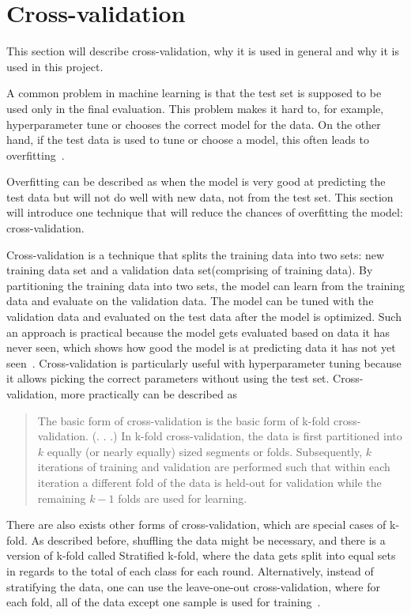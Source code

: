 \section{Cross-validation}\label{sec:cross-validation}
This section will describe cross-validation, why it is used in general and why it is used in this project.

A common problem in machine learning is that the test set is supposed to be used only in the final evaluation. This problem makes it hard to, for example, hyperparameter tune or chooses the correct model for the data. On the other hand, if the test data is used to tune or choose a model, this often leads to overfitting~\cite{james-statistical-learning}.

Overfitting can be described as when the model is very good at predicting the test data but will not do well with new data, not from the test set. This section will introduce one technique that will reduce the chances of overfitting the model: cross-validation.

Cross-validation is a technique that splits the training data into two sets: new training data set and a validation data set(comprising of training data). By partitioning the training data into two sets, the model can learn from the training data and evaluate on the validation data. The model can be tuned with the validation data and evaluated on the test data after the model is optimized. Such an approach is practical because the model gets evaluated based on data it has never seen, which shows how good the model is at predicting data it has not yet seen~\cite{scikit-learn-ml}. Cross-validation is particularly useful with hyperparameter tuning because it allows picking the correct parameters without using the test set. Cross-validation, more practically can be described as

\blockcquote{Refaeilzadeh2009}{The basic form of cross-validation is the basic form of k-fold cross-validation. (. . .) In k-fold cross-validation, the data is first partitioned into $k$ equally (or nearly equally) sized segments or folds. Subsequently, $k$ iterations of training and validation are performed such that within each iteration a different fold of the data is held-out for validation while the remaining $k-1$ folds are used for learning.}

There are also exists other forms of cross-validation, which are special cases of k-fold. As described before, shuffling the data might be necessary, and there is a version of k-fold called Stratified k-fold, where the data gets split into equal sets in regards to the total of each class for each round. Alternatively, instead of stratifying the data, one can use the leave-one-out cross-validation, where for each fold, all of the data except one sample is used for training~\cite{Refaeilzadeh2009}.

